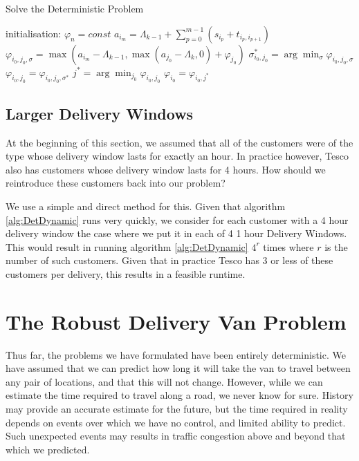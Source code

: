 \begin{algorithm} %
	\caption{Solve the Deterministic Problem}
	\label{alg:DetDynamic} %
	\begin{algorithmic} %
		\STATE initialisation: $\varphi_n = const$
						\STATE $a_{i_m}=\Lambda_{k-1}+\sum_{p=0}^{m-1}\left(s_{i_p}+t_{i_{p},i_{p+1}}\right)$
						\STATE 
						$\varphi_{i_0,j_0,\sigma}=\max(a_{i_m}-\Lambda_{k-1}, \max(a_{j_0} - \Lambda_k,0) + \varphi_{j_0})$
					\ENDFOR
					\STATE  $\sigma^*_{i_0,j_0}=\arg\min_{\sigma}\varphi_{i_0,j_0,\sigma}$
					\STATE $\varphi_{i_0,j_0}=\varphi_{i_0,j_0,\sigma^*}$
				\ENDFOR
				\STATE $j^* = \arg\min_{j_0} \varphi_{i_0,j_0}$
				\STATE $\varphi_{i_0} = \varphi_{i_0, j^*}$
			\ENDFOR
		\ENDFOR			
	\end{algorithmic}
\end{algorithm}


\subsection{Larger Delivery Windows}
\label{sec:quick_fix}
At the beginning of this section, we assumed that all of the customers were of the type whose delivery window lasts for exactly an hour. In practice however, Tesco also has customers whose delivery window lasts for 4 hours. How should we reintroduce these customers back into our problem?

We use a simple and direct method for this. Given that algorithm \ref{alg:DetDynamic} runs very quickly, we consider for each customer with a 4 hour delivery window the case where we put it in each of 4 1 hour Delivery Windows. This would result in running algorithm \ref{alg:DetDynamic} $4^r$ times where $r$ is the number of such customers. Given that in practice Tesco has 3 or less of these customers per delivery, this results in a feasible runtime.

\section{The Robust Delivery Van Problem}
\label{sec:robust}
Thus far, the problems we have formulated have been entirely deterministic. We have assumed that we can predict how long it will take the van to travel between any pair of locations, and that this will not change. However, while we can estimate the time required to travel along a road, we never know for sure. History may provide an accurate estimate for the future, but the time required in reality depends on events over which we have no control, and limited ability to predict. Such unexpected events may results in traffic congestion above and beyond that which we predicted. 

